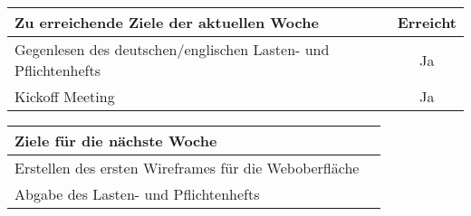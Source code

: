 \begin{tabularx}{\textwidth}{Xc}
    \arrayrulecolor{OliveGreen}
    \toprule
    {\bfseries Zu erreichende Ziele der aktuellen Woche} & {\bfseries Erreicht} \\
    \midrule[2pt]
    Gegenlesen des deutschen/englischen Lasten- und Pflichtenhefts   &Ja                    \\
    \rowcolor{OliveGreen!15}
    Kickoff Meeting                                                  &Ja                    \\
    \bottomrule[2pt]
\end{tabularx}
%
\vspace{1cm}
%
\begin{tabularx}{\textwidth}{Xc}
    \arrayrulecolor{OliveGreen}
    \toprule
    {\bfseries Ziele für die nächste Woche}              &                      \\
    \midrule[2pt]
    Erstellen des ersten Wireframes für die Weboberfläche       &                      \\
    \rowcolor{OliveGreen!15}
    Abgabe des Lasten- und Pflichtenhefts                       &                     \\
\end{tabularx}

